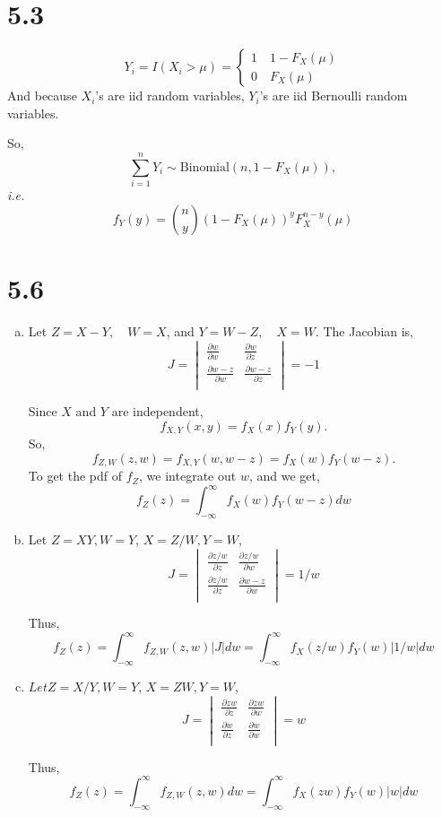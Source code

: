 \documentclass[letterpaper]{article}
\newcommand{\intii}{\int_{-\infty}^\infty}
\begin{document}
    \section*{5.3}
    \[
    Y_i = I(X_i > \mu) = 
    \begin{cases}
    1 \quad 1 - F_X(\mu) \\
    0 \quad F_X(\mu) 
    \end{cases}
    \]
    And because $X_i$'s are iid random variables, $Y_i$'s are iid Bernoulli random variables.

    So,
    \[
    \sum_{i=1}^n Y_i \sim \text{Binomial}(n, 1-F_X(\mu)),
    \]
    \emph{i.e.}
    \[
    f_Y(y) = \binom{n}{y} (1-F_X(\mu))^y F_X^{n-y}(\mu) 
    \]
    \section*{5.6}
    \begin{enumerate}[(a)]
    \item
    Let $Z = X - Y, \quad W = X$, and $Y = W-Z, \quad X=W$. The Jacobian is,
    \[
    J = \begin{vmatrix}
    \frac{\partial w}{\partial w} & \frac{\partial w}{\partial z} \\
    \frac{\partial w-z}{\partial w} & \frac{\partial w-z}{\partial z} \\
    \end{vmatrix} = -1
    \]

    Since $X$ and $Y$ are independent, 
    \[
    f_{X,Y}(x, y) = f_X(x) f_Y(y).
    \]
    So, 
    \[
    f_{Z,W}(z, w) = f_{X,Y}(w, w-z) = f_X(w) f_Y(w-z).
    \]
    To get the pdf of $f_Z$, we integrate out $w$, and we get,
    \[
    f_Z(z) = \intii f_X(w) f_Y(w-z) dw
    \]
    \item
    Let $Z = XY, W = Y$, $X = Z/W, Y = W$,
    \[
    J = \begin{vmatrix}
    \frac{\partial z/w}{\partial z} & \frac{\partial z/w}{\partial w} \\
    \frac{\partial z/w}{\partial z} & \frac{\partial w-z}{\partial w} \\
    \end{vmatrix} = 1/w 
    \]

    Thus,
    \[
    f_Z(z) = \intii f_{Z, W}(z, w) |J| dw = \intii f_X(z/w)f_Y(w) |1/w| dw
    \]
    \item $Let Z=X/Y, W = Y$, $X = ZW, Y = W$, 
    \[
    J = \begin{vmatrix}
    \frac{\partial zw}{\partial z} & \frac{\partial zw}{\partial w} \\
    \frac{\partial w}{\partial z} & \frac{\partial w}{\partial w} \\
    \end{vmatrix} = w 
    \]

    Thus,
    \[
    f_Z(z) = \intii f_{Z,W}(z, w) dw = \intii f_X(zw) f_Y(w) |w| dw
    \]
    \end{enumerate}
\end{document}

